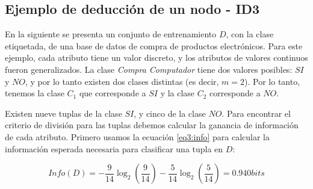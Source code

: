 \subsection{Ejemplo de deducción de un nodo - ID3}

En la siguiente  se presenta un conjunto de entrenamiento $D$, con la clase etiquetada, de una base de datos de compra de productos electrónicos. Para este ejemplo, cada atributo tiene un valor discreto, y los atributos de valores continuos fueron generalizados. La clase \textit{Compra Computador} tiene dos valores posibles: $SI$ y $NO$, y por lo tanto existen dos clases distintas (es decir, $m=2$). Por lo tanto, tenemos la clase $C_1$ que corresponde a $SI$ y la clase $C_2$ corresponde a $NO$.

Existen nueve tuplas de la clase $SI$, y cinco de la clase $NO$. Para encontrar el criterio de división para las tuplas debemos calcular la ganancia de información de cada atributo. Primero usamos la ecuación \ref{eq3:info} para calcular la información esperada necesaria para clasificar una tupla en $D$:

\begin{equation*}
Info(D) = - \frac{9}{14}\log_2(\frac{9}{14}) - \frac{5}{14}\log_2(\frac{5}{14})	= 0.940 bits
\end{equation*}

